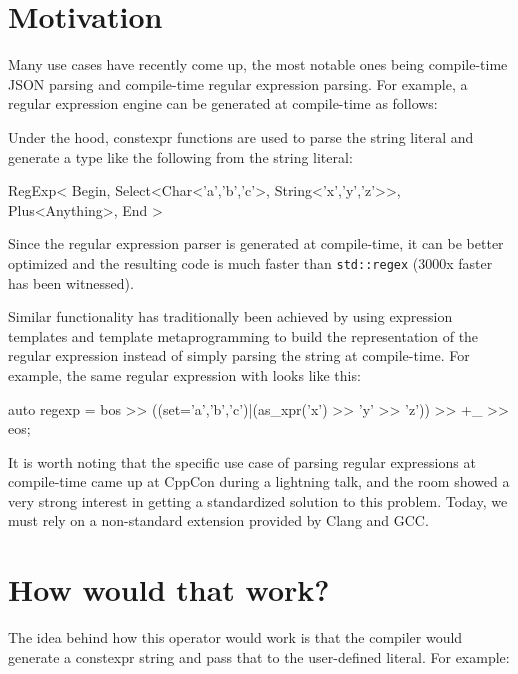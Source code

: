 \documentclass{wg21}
\newcommand{\cc}[1]{\texttt{#1}}
\begin{document}
\section{Motivation}
Many use cases have recently come up, the most notable ones being compile-time
JSON parsing and compile-time regular expression parsing. For example, a
regular expression engine can be generated at compile-time as follows:


Under the hood, constexpr functions are used to parse the string literal and
generate a type like the following from the string literal:

\begin{cpp}
RegExp<
  Begin,
  Select<Char<'a','b','c'>, String<'x','y','z'>>,
  Plus<Anything>,
  End
>
\end{cpp}

Since the regular expression parser is generated at compile-time, it can be
better optimized and the resulting code is much faster than \cc{std::regex}
(3000x faster has been witnessed).

Similar functionality has traditionally been achieved by using expression
templates and template metaprogramming to build the representation of the
regular expression instead of simply parsing the string at compile-time.
For example, the same regular expression with \cite{Boost.Xpressive} looks
like this:

\begin{cpp}
auto regexp = bos >> ((set='a','b','c')|(as_xpr('x') >> 'y' >> 'z')) >> +_ >> eos;
\end{cpp}

It is worth noting that the specific use case of parsing regular expressions
at compile-time came up at CppCon during a lightning talk, and the room showed
a very strong interest in getting a standardized solution to this problem.
Today, we must rely on a non-standard extension provided by Clang and GCC.


\section{How would that work?}
The idea behind how this operator would work is that the compiler would
generate a constexpr string and pass that to the user-defined literal.
For example:
\end{document}

